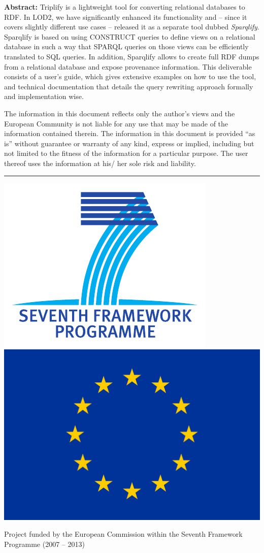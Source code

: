 \documentclass[a4paper,twoside,bibtotoc,abstracton,12pt,BCOR=15mm]{article}
\begin{document}
\textbf{Abstract:} Triplify is a lightweight tool for converting relational databases to RDF. %
In LOD2, we have significantly enhanced its functionality and -- since it covers slightly different use cases -- released it as a separate tool dubbed \emph{Sparqlify}.
Sparqlify is based on using CONSTRUCT queries to define views on a relational database in such a way that SPARQL queries on those views can be efficiently translated to SQL queries.
In addition, Sparqlify allows to create full RDF dumps from a relational database and expose provenance information.
This deliverable consists of a user's guide,
which gives extensive examples on how to use the tool,
and technical documentation that details the query rewriting approach formally and implementation wise.

\vspace{10pt}

\tiny{
The information in this document reflects only the author’s views and the European Community is not liable for
any use that may be made of the information contained therein. The information in this document is provided “as is”
without guarantee or warranty of any kind, express or implied, including but not limited to the fitness of the
information for a particular purpose. The user thereof uses the information at his/ her sole risk and liability.}

\rule{\textwidth}{0.4pt}

\begin{center}
 \includegraphics[scale=0.3]{../Common/FP7}\hspace{1cm}
\includegraphics[scale=0.1]{../Common/Flag_of_Europe}
\end{center}


Project funded by the European Commission within the Seventh Framework Programme (2007 – 2013)
\end{document}
